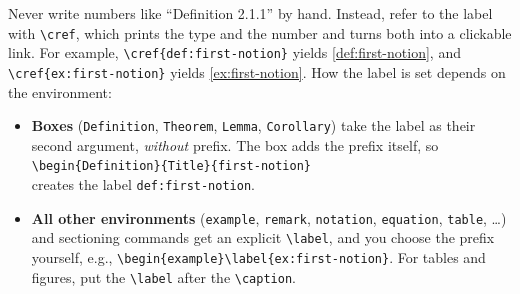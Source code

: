 Never write numbers like ``Definition 2.1.1'' by hand.
Instead, refer to the label with \lstinline|\cref|, which prints the type and
the number and turns both into a clickable link.
For example, \lstinline|\cref{def:first-notion}| yields \cref{def:first-notion},
and \lstinline|\cref{ex:first-notion}| yields \cref{ex:first-notion}.
How the label is set depends on the environment:
\begin{itemize}
    \item \textbf{Boxes} (\lstinline|Definition|, \lstinline|Theorem|,
          \lstinline|Lemma|, \lstinline|Corollary|) take the label as their
          second argument, \emph{without} prefix.
          The box adds the prefix itself, so\\
          \lstinline|\begin{Definition}{Title}{first-notion}|\\
          creates the label \lstinline|def:first-notion|.
    \item \textbf{All other environments} (\lstinline|example|,
          \lstinline|remark|, \lstinline|notation|, \lstinline|equation|,
          \lstinline|table|, \ldots) and sectioning commands get an explicit
          \lstinline|\label|, and you choose the prefix yourself, e.g.,
          \lstinline|\begin{example}\label{ex:first-notion}|.
          For tables and figures, put the \lstinline|\label| after the
          \lstinline|\caption|.
\end{itemize}

